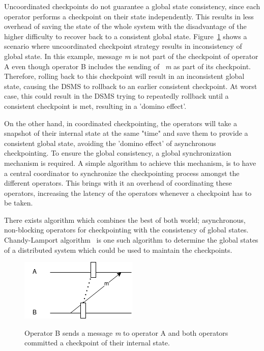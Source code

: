 Uncoordinated checkpoints do not guarantee a global state consistency, since 
each operator performs a checkpoint on their state independently. This results 
in less overhead of saving the state of the whole system with the disadvantage of the higher 
difficulty to recover back to a consistent global state. Figure~\ref{fig:checkpoint_inconsistency}
shows a scenario where uncoordinated checkpoint strategy results in inconsistency of 
global state. In this example, message \emph{m} is not part of the checkpoint of operator 
A even though operator B includes the sending of ~\emph{m} as part of its checkpoint. Therefore, 
rolling back to this checkpoint will result in an inconsistent global state, causing the 
DSMS to rollback to an earlier consistent checkpoint. At worst case, this could result 
in the DSMS trying to repeatedly rollback until a consistent checkpoint is met, 
resulting in a 'domino effect'.  

On the other hand, in coordinated checkpointing, the operators will take a snapshot 
of their internal state at the same "time" and save them to provide a consistent 
global state, avoiding the 'domino effect' of asynchronous checkpointing. To ensure 
the global consistency, a global synchronization mechanism is required. A simple 
algorithm to achieve this mechanism, is to have a central coordinator to synchronize 
the checkpointing process amongst the different operators. This brings with it an overhead 
of coordinating these operators, increasing the latency of the operators whenever a 
checkpoint has to be taken. 


There exists algorithm which combines the best of both world; asynchronous, non-blocking
operators for checkpointing with the consistency of global states. 
Chandy-Lamport algorithm~\cite{chandy_lamport} is one such algorithm to determine the 
global states of a distributed system which could be used to maintain the checkpoints. 

\begin{figure}[!htbp]
    \centering
    \includegraphics{fig/checkpoint_inconsistency.png}
    \label{fig:checkpoint_inconsistency}
    \caption{Operator B sends a message \emph{m} to operator A and both operators 
    committed a checkpoint of their internal state.}
\end{figure}

